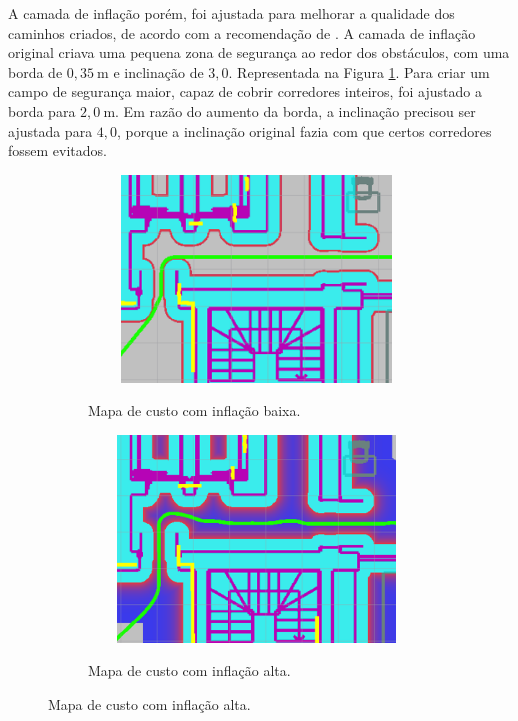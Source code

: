 \documentclass[repeatfields,xlists,xpacks,oneside,yearsonly]{ufrgscca}
\begin{document}
A camada de inflação porém, foi ajustada para melhorar a qualidade dos
caminhos criados, de acordo com a recomendação de \textcite{ros_tuning_guide}.
A camada de inflação original criava uma pequena zona de segurança ao redor
dos obstáculos, com uma borda de $0,35~\si{\meter}$ e inclinação de $3,0$.
Representada na Figura \ref{fig:inflation_low}.
Para criar um campo de segurança maior, capaz de cobrir corredores inteiros,
foi ajustado a borda para $2,0~\si{\meter}$.
Em razão do aumento da borda, a inclinação precisou ser ajustada para $4,0$,
porque a inclinação original fazia com que certos corredores fossem evitados.

\begin{figure}[h]
    \caption{Trajetórias criadas com diferentes configurações da camada de inflação}
    \begin{subfigure}{0.5\linewidth}
        {
            \centering
            \caption{Mapa de custo com inflação baixa.}
            \label{fig:inflation_low}
            \includegraphics[width=0.98\textwidth, height=5.5cm]{costmap_not_inflated.png}\\
        }
    \end{subfigure}
    \begin{subfigure}{0.5\linewidth}
        {
            \centering
            \caption{Mapa de custo com inflação alta.}
            \label{fig:inflation_high}
            \includegraphics[width=0.98\textwidth, height=5.5cm]{costmap_inflated.png}\\
        }
    \end{subfigure}
\end{figure}
\end{document}
